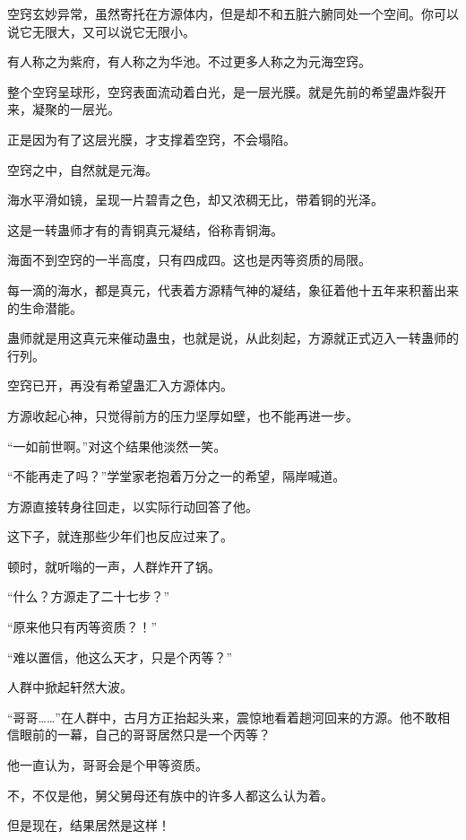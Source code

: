 
\begin{this_body}

空窍玄妙异常，虽然寄托在方源体内，但是却不和五脏六腑同处一个空间。你可以说它无限大，又可以说它无限小。

有人称之为紫府，有人称之为华池。不过更多人称之为元海空窍。

整个空窍呈球形，空窍表面流动着白光，是一层光膜。就是先前的希望蛊炸裂开来，凝聚的一层光。

正是因为有了这层光膜，才支撑着空窍，不会塌陷。

空窍之中，自然就是元海。

海水平滑如镜，呈现一片碧青之色，却又浓稠无比，带着铜的光泽。

这是一转蛊师才有的青铜真元凝结，俗称青铜海。

海面不到空窍的一半高度，只有四成四。这也是丙等资质的局限。

每一滴的海水，都是真元，代表着方源精气神的凝结，象征着他十五年来积蓄出来的生命潜能。

蛊师就是用这真元来催动蛊虫，也就是说，从此刻起，方源就正式迈入一转蛊师的行列。

空窍已开，再没有希望蛊汇入方源体内。

方源收起心神，只觉得前方的压力坚厚如壁，也不能再进一步。

“一如前世啊。”对这个结果他淡然一笑。

“不能再走了吗？”学堂家老抱着万分之一的希望，隔岸喊道。

方源直接转身往回走，以实际行动回答了他。

这下子，就连那些少年们也反应过来了。

顿时，就听嗡的一声，人群炸开了锅。

“什么？方源走了二十七步？”

“原来他只有丙等资质？！”

“难以置信，他这么天才，只是个丙等？”

人群中掀起轩然大波。

“哥哥……”在人群中，古月方正抬起头来，震惊地看着趟河回来的方源。他不敢相信眼前的一幕，自己的哥哥居然只是一个丙等？

他一直认为，哥哥会是个甲等资质。

不，不仅是他，舅父舅母还有族中的许多人都这么认为着。

但是现在，结果居然是这样！


\end{this_body}
